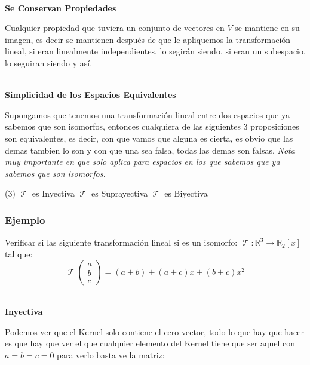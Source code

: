 \documentclass[12pt]{report}                                %
\DeclareMathOperator \LinealTransformation {\mathcal{T}}
\begin{document}
            \textbf{\\Se Conservan Propiedades}

            Cualquier propiedad que tuviera un conjunto de vectores en $V$ se mantiene
            en su imagen, es decir se mantienen después de que le apliquemos la
            transformación lineal, si eran linealmente independientes, lo segirán siendo,
            si eran un subespacio, lo seguiran siendo y así.

            \textbf{\\Simplicidad de los Espacios Equivalentes}

            Supongamos que tenemos una transformación lineal entre dos espacios que ya
            sabemos que son isomorfos, entonces cualquiera de las siguientes 3 proposiciones
            son equivalentes, es decir, con que vamos que alguna es cierta, es obvio que las
            demas tambien lo son y con que una sea falsa, todas las demas son falsas.
            \emph{Nota muy importante en que solo aplica para espacios en los que sabemos que ya sabemos que son isomorfos.}

            \begin{tasks}(3)
                \task $\LinealTransformation$ es Inyectiva
                \task $\LinealTransformation$ es Suprayectiva
                \task $\LinealTransformation$ es Biyectiva
            \end{tasks}



            \clearpage
            \subsubsection{Ejemplo}
            Verificar si las siguiente transformación lineal si es un isomorfo:
            $\LinealTransformation : \mathbb{R}^3 \to \mathbb{R}_2[x]$ tal que: 
            \begin{equation*}
            \LinealTransformation(\begin{matrix}a\\b\\c\end{matrix}) = (a+b)+(a+c)x+(b+c)x^2
            \end{equation*}


            \textbf{\\Inyectiva}

            Podemos ver que el Kernel solo contiene el cero vector, todo lo que hay que hacer es
            que hay que ver el que cualquier elemento del Kernel tiene que ser aquel con $a=b=c=0$
            para verlo basta ve la matriz:
\end{document}
